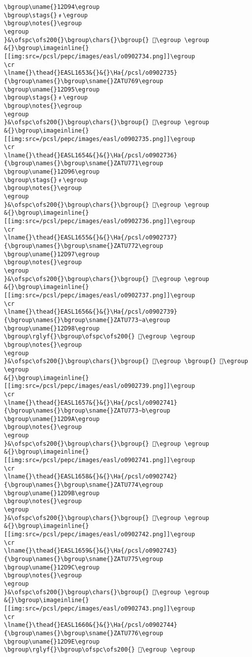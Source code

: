 \begin{verbatim}
\bgroup\uname{}12D94\egroup
\bgroup\stags{}﹟\egroup
\bgroup\notes{}\egroup
\egroup
}&\ofspc\ofs200{}\bgroup\chars{}\bgroup{} 𒶔\egroup \egroup
&{}\bgroup\imageinline{}[[img:src=/pcsl/pepc/images/easl/o0902734.png]]\egroup
\cr
\lname{}\thead{}EASL1653&{}&{}\Ha{/pcsl/o0902735}{\bgroup\names{}\bgroup\sname{}ZATU769\egroup
\bgroup\uname{}12D95\egroup
\bgroup\stags{}﹟\egroup
\bgroup\notes{}\egroup
\egroup
}&\ofspc\ofs200{}\bgroup\chars{}\bgroup{} 𒶕\egroup \egroup
&{}\bgroup\imageinline{}[[img:src=/pcsl/pepc/images/easl/o0902735.png]]\egroup
\cr
\lname{}\thead{}EASL1654&{}&{}\Ha{/pcsl/o0902736}{\bgroup\names{}\bgroup\sname{}ZATU771\egroup
\bgroup\uname{}12D96\egroup
\bgroup\stags{}﹟\egroup
\bgroup\notes{}\egroup
\egroup
}&\ofspc\ofs200{}\bgroup\chars{}\bgroup{} 𒶖\egroup \egroup
&{}\bgroup\imageinline{}[[img:src=/pcsl/pepc/images/easl/o0902736.png]]\egroup
\cr
\lname{}\thead{}EASL1655&{}&{}\Ha{/pcsl/o0902737}{\bgroup\names{}\bgroup\sname{}ZATU772\egroup
\bgroup\uname{}12D97\egroup
\bgroup\notes{}\egroup
\egroup
}&\ofspc\ofs200{}\bgroup\chars{}\bgroup{} 𒶗\egroup \egroup
&{}\bgroup\imageinline{}[[img:src=/pcsl/pepc/images/easl/o0902737.png]]\egroup
\cr
\lname{}\thead{}EASL1656&{}&{}\Ha{/pcsl/o0902739}{\bgroup\names{}\bgroup\sname{}ZATU773∼a\egroup
\bgroup\uname{}12D98\egroup
\bgroup\rglyf{}\bgroup\ofspc\ofs200{} 𒶘\egroup \egroup
\bgroup\notes{}\egroup
\egroup
}&\ofspc\ofs200{}\bgroup\chars{}\bgroup{} 𒶘\egroup \bgroup{} 𒶙\egroup \egroup
&{}\bgroup\imageinline{}[[img:src=/pcsl/pepc/images/easl/o0902739.png]]\egroup
\cr
\lname{}\thead{}EASL1657&{}&{}\Ha{/pcsl/o0902741}{\bgroup\names{}\bgroup\sname{}ZATU773∼b\egroup
\bgroup\uname{}12D9A\egroup
\bgroup\notes{}\egroup
\egroup
}&\ofspc\ofs200{}\bgroup\chars{}\bgroup{} 𒶚\egroup \egroup
&{}\bgroup\imageinline{}[[img:src=/pcsl/pepc/images/easl/o0902741.png]]\egroup
\cr
\lname{}\thead{}EASL1658&{}&{}\Ha{/pcsl/o0902742}{\bgroup\names{}\bgroup\sname{}ZATU774\egroup
\bgroup\uname{}12D9B\egroup
\bgroup\notes{}\egroup
\egroup
}&\ofspc\ofs200{}\bgroup\chars{}\bgroup{} 𒶛\egroup \egroup
&{}\bgroup\imageinline{}[[img:src=/pcsl/pepc/images/easl/o0902742.png]]\egroup
\cr
\lname{}\thead{}EASL1659&{}&{}\Ha{/pcsl/o0902743}{\bgroup\names{}\bgroup\sname{}ZATU775\egroup
\bgroup\uname{}12D9C\egroup
\bgroup\notes{}\egroup
\egroup
}&\ofspc\ofs200{}\bgroup\chars{}\bgroup{} 𒶜\egroup \egroup
&{}\bgroup\imageinline{}[[img:src=/pcsl/pepc/images/easl/o0902743.png]]\egroup
\cr
\lname{}\thead{}EASL1660&{}&{}\Ha{/pcsl/o0902744}{\bgroup\names{}\bgroup\sname{}ZATU776\egroup
\bgroup\uname{}12D9E\egroup
\bgroup\rglyf{}\bgroup\ofspc\ofs200{} 𒶞\egroup \egroup

\end{verbatim}

